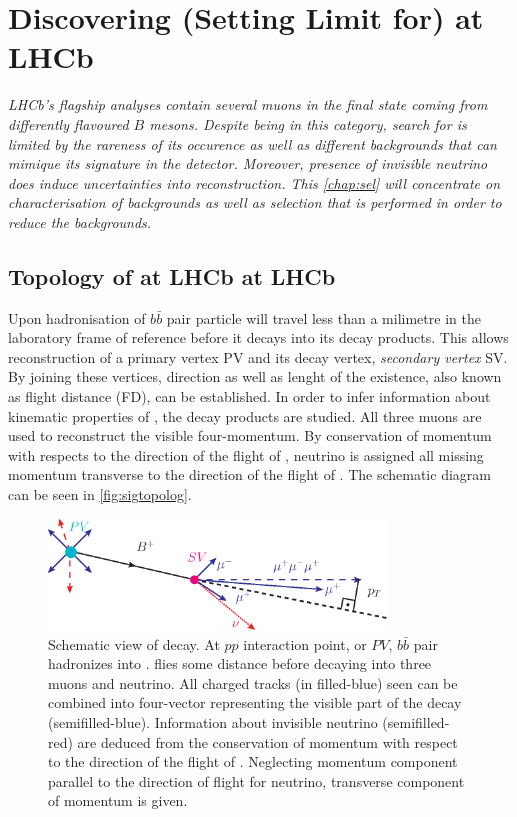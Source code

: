\chapter{Discovering (Setting Limit for) \Bmumumu at LHCb}
\label{chap:sel}

\textit{LHCb's flagship analyses contain several muons in the final state coming from differently flavoured $B$ mesons. Despite being in this category, search for \Bmumumu is limited by the rareness of its occurence as well as different backgrounds that can mimique its signature in the detector. Moreover, presence of invisible neutrino does induce uncertainties into reconstruction. This \autoref{chap:sel} will concentrate on characterisation of backgrounds as well as selection that is performed in order to reduce the backgrounds.}


\section{Topology of at LHCb \Bmumumu at LHCb}

Upon hadronisation of $b\bar{b}$ pair \Bpm particle will travel less than a milimetre in the laboratory frame of reference before it decays into its decay products. This allows reconstruction of a primary vertex \Gls{PV} and its decay vertex, \textit{secondary vertex} \Gls{SV}. By joining these vertices, direction as well as lenght of the \Bpm existence, also known as flight distance (\Gls{FD}), can be established. In order to infer information about kinematic properties of \Bpm, the decay products are studied. All three muons are used to reconstruct the visible four-momentum. By conservation of momentum with respects to the direction of the flight of \Bpm, neutrino is assigned all missing momentum transverse to the direction of the flight of \Bpm. The schematic diagram can be seen in \autoref{fig:sigtopolog}.

\begin{figure}[!h]
	\centering
	\includegraphics[width = 0.8\textwidth]{figs/sel/DecReco_fin.eps}
	\caption{Schematic view of \Bmumumu decay. At $pp$ interaction point, or $PV$, $b\bar{b}$ pair hadronizes into \Bpm. \Bpm flies some distance before decaying into three muons and neutrino. All charged tracks (in filled-blue) seen can be combined into four-vector representing the visible part of the decay (semifilled-blue). Information about invisible neutrino (semifilled-red) are deduced from the conservation of momentum with respect to the direction of the flight of \Bpm. Neglecting momentum component parallel to the direction of flight for neutrino, transverse component of momentum is given.}
	\label{fig:sigtopolog}
\end{figure}

